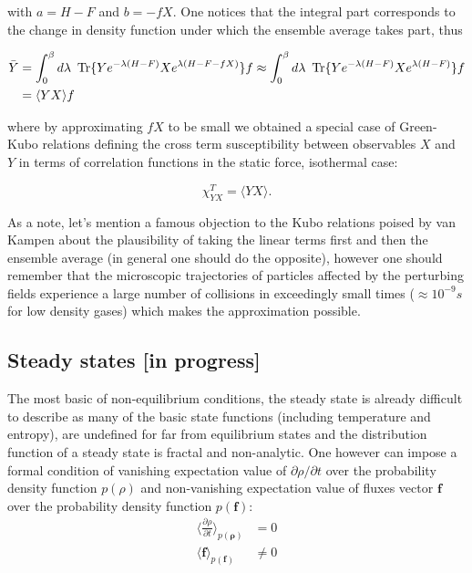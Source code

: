 \documentclass[a4paper,12pt]{article}
\begin{document}
with $a=H-F$ and $b=-f X$. One notices that the integral part corresponds to the change in density function under which the ensemble average takes part, thus

\begin{equation}
\begin{aligned}
  \bar{Y} &= \int_0^{\beta} d\lambda\ \Tr\{ Y e^{-\lambda (H - F)} X e^{\lambda (H-F-f X)} \} f \approx  \int_0^{\beta} d\lambda\ \Tr\{ Y e^{-\lambda (H - F)} X e^{\lambda (H-F)} \} f \\
  &= \langle Y X \rangle f
\end{aligned}
\end{equation}

where by approximating $f X$ to be small we obtained a special case of Green-Kubo relations defining the cross term susceptibility between observables $X$ and $Y$ in terms of correlation functions in the static force, isothermal case:

\begin{equation}
  \chi_{YX}^T = \langle Y X \rangle.
\end{equation}

As a note, let's mention a famous objection to the Kubo relations poised by van Kampen about the plausibility of taking the linear terms first and then the ensemble average (in general one should do the opposite), however one should remember that the microscopic trajectories of particles affected by the perturbing fields experience a large number of collisions in exceedingly small times ($\approx 10^{-9}s$ for low density gases) which makes the approximation possible\cite{Dorfman:ozm67-zD}.
\subsection{Steady states [in progress]}
The most basic of non-equilibrium conditions, the steady state is already difficult to describe as many of the basic state functions (including temperature and entropy), are undefined for far from equilibrium states and the distribution function of a steady state is fractal and non-analytic. %
One however can impose a formal condition of vanishing expectation value of $\partial \rho / \partial t$ over the probability density function $p(\rho)$ and non-vanishing expectation value of fluxes vector $\bm{f}$ over the probability density function $p(\bm{f})$: %
\begin{equation}
\begin{aligned}
\label{SteadyStates}
  \langle \frac{\partial \rho}{\partial t} \rangle_{p(\bm{\rho})} &= 0 \\
  \langle \bm{f} \rangle_{p(\bm{f})} &\neq 0
\end{aligned}
\end{equation}
\end{document}
